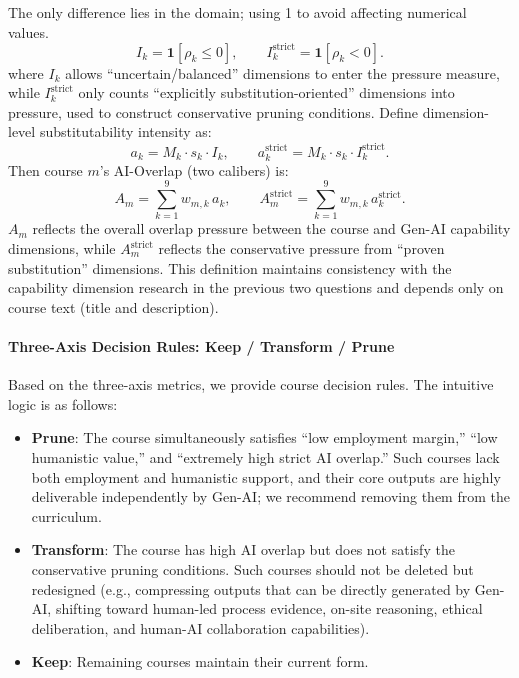 The only difference lies in the domain; using 1 to avoid affecting numerical values.
\begin{equation}
    I_k=\mathbf{1}[\rho_k\le 0], \qquad I_k^{\mathrm{strict}}=\mathbf{1}[\rho_k<0].
\end{equation}
where $I_k$ allows ``uncertain/balanced'' dimensions to enter the pressure measure, while $I_k^{\mathrm{strict}}$ only counts ``explicitly substitution-oriented'' dimensions into pressure, used to construct conservative pruning conditions. Define dimension-level substitutability intensity as:
\begin{equation}
    a_k=M_k\cdot s_k\cdot I_k, \qquad a_k^{\mathrm{strict}}=M_k\cdot s_k\cdot I_k^{\mathrm{strict}}.
\end{equation}
Then course $m$'s AI-Overlap (two calibers) is:
\begin{equation}
    A_m=\sum_{k=1}^{9} w_{m,k}\,a_k, \qquad A_m^{\mathrm{strict}}=\sum_{k=1}^{9} w_{m,k}\,a_k^{\mathrm{strict}}.
\end{equation}
$A_m$ reflects the overall overlap pressure between the course and Gen-AI capability dimensions, while $A_m^{\mathrm{strict}}$ reflects the conservative pressure from ``proven substitution'' dimensions. This definition maintains consistency with the capability dimension research in the previous two questions and depends only on course text (title and description).

\paragraph{Three-Axis Decision Rules: Keep / Transform / Prune}
Based on the three-axis metrics, we provide course decision rules. The intuitive logic is as follows:
\begin{itemize}
    \item \textbf{Prune}: The course simultaneously satisfies ``low employment margin,'' ``low humanistic value,'' and ``extremely high strict AI overlap.'' Such courses lack both employment and humanistic support, and their core outputs are highly deliverable independently by Gen-AI; we recommend removing them from the curriculum.
    \item \textbf{Transform}: The course has high AI overlap but does not satisfy the conservative pruning conditions. Such courses should not be deleted but redesigned (e.g., compressing outputs that can be directly generated by Gen-AI, shifting toward human-led process evidence, on-site reasoning, ethical deliberation, and human-AI collaboration capabilities).
    \item \textbf{Keep}: Remaining courses maintain their current form.
\end{itemize}

